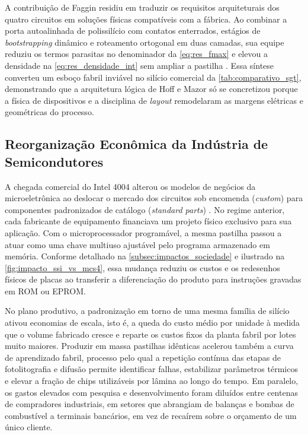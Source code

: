A contribuição de Faggin residiu em traduzir os requisitos arquiteturais dos quatro circuitos em soluções físicas compatíveis com a fábrica. Ao combinar a porta autoalinhada de polissilício com contatos enterrados, estágios de \textit{bootstrapping} dinâmico e roteamento ortogonal em duas camadas, sua equipe reduziu os termos parasitas no denominador da \cref{eq:res_fmax} e elevou a densidade na \cref{eq:res_densidade_int} sem ampliar a pastilha \cite{faggin1970, faggin2021}. Essa síntese converteu um esboço fabril inviável no silício comercial da \cref{tab:comparativo_sgt}, demonstrando que a arquitetura lógica de Hoff e Mazor só se concretizou porque a física de dispositivos e a disciplina de \textit{layout} remodelaram as margens elétricas e geométricas do processo.

\subsection{Reorganização Econômica da Indústria de Semicondutores}
\label{subsec:reorganizacao_economica}

A chegada comercial do Intel 4004 alterou os modelos de negócios da microeletrônica ao deslocar o mercado dos circuitos sob encomenda (\textit{custom}) para componentes padronizados de catálogo (\textit{standard parts}) \cite{faggin1972fourchip}. No regime anterior, cada fabricante de equipamento financiava um projeto físico exclusivo para sua aplicação. Com o microprocessador programável, a mesma pastilha passou a atuar como uma chave multiuso ajustável pelo programa armazenado em memória. Conforme detalhado na \cref{subsec:impactos_sociedade} e ilustrado na \cref{fig:impacto_ssi_vs_mcs4}, essa mudança reduziu os custos e os redesenhos físicos de placas ao transferir a diferenciação do produto para instruções gravadas em ROM ou EPROM.

No plano produtivo, a padronização em torno de uma mesma família de silício ativou economias de escala, isto é, a queda do custo médio por unidade à medida que o volume fabricado cresce e reparte os custos fixos da planta fabril por lotes muito maiores. Produzir em massa pastilhas idênticas acelerou também a curva de aprendizado fabril, processo pelo qual a repetição contínua das etapas de fotolitografia e difusão permite identificar falhas, estabilizar parâmetros térmicos e elevar a fração de chips utilizáveis por lâmina ao longo do tempo. Em paralelo, os gastos elevados com pesquisa e desenvolvimento foram diluídos entre centenas de compradores industriais, em setores que abrangiam de balanças e bombas de combustível a terminais bancários, em vez de recaírem sobre o orçamento de um único cliente.

